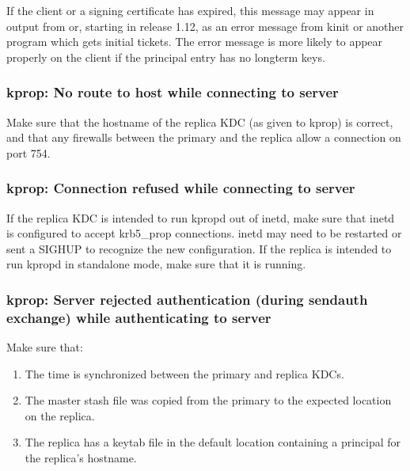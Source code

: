 \documentclass[letterpaper,10pt,english]{sphinxmanual}
\begin{document}
\sphinxAtStartPar
If the client or a signing certificate has expired, this message may
appear in {\hyperref[\detokenize{admin/troubleshoot:trace-logging}]{}} output from  or, starting in
release 1.12, as an error message from kinit or another program which
gets initial tickets.  The error message is more likely to appear
properly on the client if the principal entry has no long\sphinxhyphen{}term keys.


\subsubsection{kprop: No route to host while connecting to server}
\label{\detokenize{admin/troubleshoot:kprop-no-route-to-host-while-connecting-to-server}}\label{\detokenize{admin/troubleshoot:kprop-no-route}}
\sphinxAtStartPar
Make sure that the hostname of the replica KDC (as given to kprop) is
correct, and that any firewalls between the primary and the replica
allow a connection on port 754.


\subsubsection{kprop: Connection refused while connecting to server}
\label{\detokenize{admin/troubleshoot:kprop-connection-refused-while-connecting-to-server}}\label{\detokenize{admin/troubleshoot:kprop-con-refused}}
\sphinxAtStartPar
If the replica KDC is intended to run kpropd out of inetd, make sure
that inetd is configured to accept krb5\_prop connections.  inetd may
need to be restarted or sent a SIGHUP to recognize the new
configuration.  If the replica is intended to run kpropd in standalone
mode, make sure that it is running.


\subsubsection{kprop: Server rejected authentication (during sendauth exchange) while authenticating to server}
\label{\detokenize{admin/troubleshoot:kprop-server-rejected-authentication-during-sendauth-exchange-while-authenticating-to-server}}\label{\detokenize{admin/troubleshoot:kprop-sendauth-exchange}}
\sphinxAtStartPar
Make sure that:
\begin{enumerate}
%
\item {} 
\sphinxAtStartPar
The time is synchronized between the primary and replica KDCs.

\item {} 
\sphinxAtStartPar
The master stash file was copied from the primary to the expected
location on the replica.

\item {} 
\sphinxAtStartPar
The replica has a keytab file in the default location containing a
 principal for the replica’s hostname.

\end{enumerate}
\end{document}

